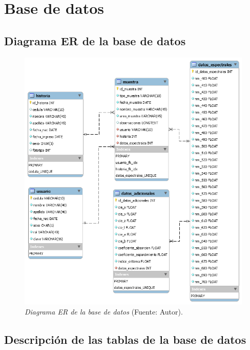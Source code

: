 \newpage

\section{Base de datos}

	\subsection{Diagrama ER de la base de datos}

	\begin{figure}[H]
		\centering
		\includegraphics[scale=0.55]{img/diagramaER.png}
			\caption[Diagrama ER de la base de datos]{\textit{Diagrama ER de la base de datos} (Fuente: Autor).}
	\end{figure}
	
	\subsection{Descripci\'{o}n de las tablas de la base de datos}
	
